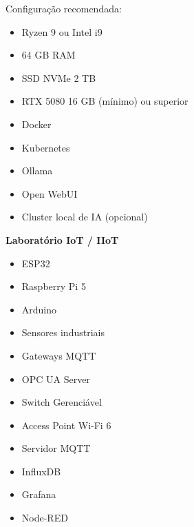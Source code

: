 Configuração recomendada:
\begin{itemize}
    \item Ryzen 9 ou Intel i9
    \item 64 GB RAM
    \item SSD NVMe 2 TB
    \item RTX 5080 16 GB (mínimo) ou superior
    \item Docker
    \item Kubernetes
    \item Ollama
    \item Open WebUI
    \item Cluster local de IA (opcional)
\end{itemize}

\textbf{Laboratório IoT / IIoT}
\begin{itemize}
    \item ESP32
    \item Raspberry Pi 5
    \item Arduino
    \item Sensores industriais
    \item Gateways MQTT
    \item OPC UA Server
    \item Switch Gerenciável
    \item Access Point Wi-Fi 6
    \item Servidor MQTT
    \item InfluxDB
    \item Grafana
    \item Node-RED
\end{itemize}